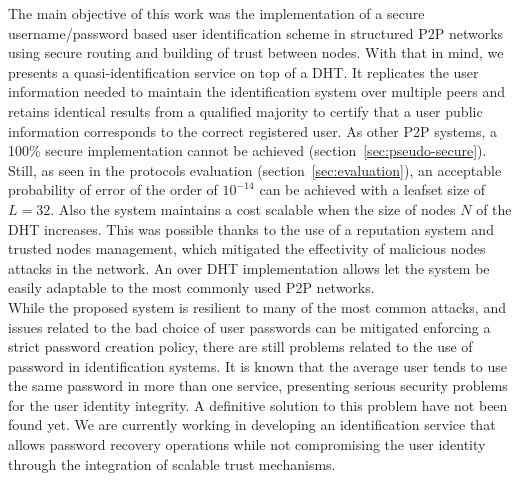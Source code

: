 The main objective of this work was the implementation of a secure
username/password based user identification scheme in structured P2P
networks using secure routing and building of trust between nodes.
With that in mind, we presents a quasi-identification service on top of a DHT. It
replicates the user information needed to maintain the identification system
over multiple peers and retains identical results from a qualified majority to
certify that a user public information corresponds to the correct registered user.
As other P2P
systems, a 100\% secure implementation cannot be achieved
(section~\ref{sec:pseudo-secure}). Still, as seen in the
protocols evaluation (section~\ref{sec:evaluation}), an acceptable probability of error of the order
of $10^{-14}$ can be achieved with a leafset size of $L = 32$. Also the system
maintains a cost scalable when the size of nodes $N$ of the DHT increases.
This was possible thanks to the use of a reputation system and trusted
nodes management, which mitigated the effectivity of malicious nodes attacks in
the network.
An over DHT implementation allows let the system be easily adaptable  to the
most commonly used P2P networks.\\


While the proposed system is resilient to many of the most common attacks,
and issues related to the bad choice of user passwords can be mitigated enforcing a
strict password creation policy, there are still problems related to the use of
password in identification systems.
It is known that the average user tends to use the
same password in more than one service, presenting serious security problems
for the user identity integrity. A definitive solution to this problem have not
been found yet.
We are currently working in developing an identification service that
allows password recovery operations while not compromising the user identity
through the integration of scalable trust mechanisms.

